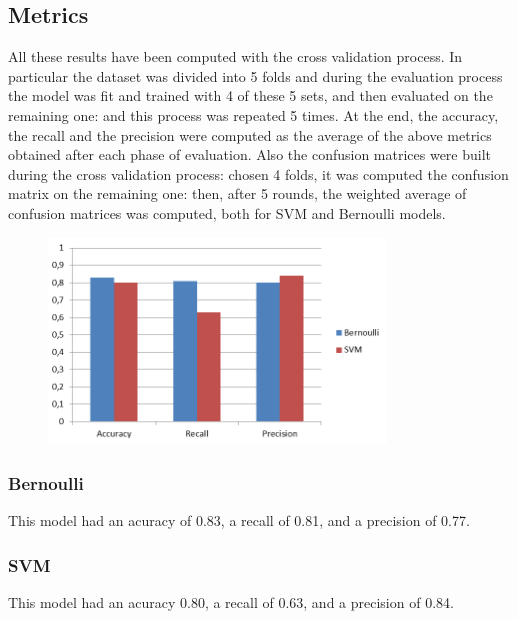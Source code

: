 \documentclass[12pt]{article}
\begin{document}
\subsection{Metrics}
All these results have been computed with the cross validation process. In particular the dataset was divided into 5 folds and during the evaluation process the model was fit and trained with 4 of these 5 sets, and then evaluated on the remaining one: and this process was repeated 5 times. At the end, the accuracy, the recall and the precision were computed as the average of the above metrics obtained after each phase of evaluation. Also the confusion matrices were built during the cross validation process: chosen 4 folds, it was computed the confusion matrix on the remaining one: then, after 5 rounds, the weighted average of confusion matrices was computed, both for SVM and Bernoulli models.
\begin{figure}[!ht]
	\centering %
	\includegraphics[width=0.8\textwidth]{metrics.png} %
	\caption{} 
	\label{fig:metrics}
\end{figure}

\subsubsection{Bernoulli}
This model had an acuracy of 0.83, a recall of 0.81, and a precision of 0.77.

\subsubsection{SVM}
This model had an acuracy 0.80, a recall of 0.63, and a precision of 0.84.
\end{document}
